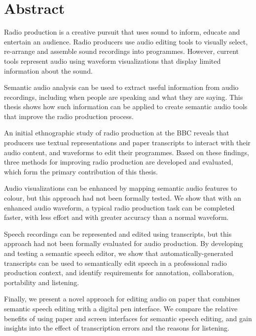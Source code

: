\chapter*{Abstract}

Radio production is a creative pursuit that uses sound to inform, educate and entertain an audience. Radio producers
use audio editing tools to visually select, re-arrange and assemble sound recordings into programmes. However, current
tools represent audio using waveform visualizations that display limited information about the sound.

Semantic audio analysis can be used to extract useful information from audio recordings, including when people are
speaking and what they are saying. This thesis shows how such information can be applied to create semantic audio tools
that improve the radio production process.

An initial ethnographic study of radio production at the BBC reveals that producers use textual representations and
paper transcripts to interact with their audio content, and waveforms to edit their programmes. Based on these
findings, three methods for improving radio production are developed and evaluated, which form the primary contribution
of this thesis.

Audio visualizations can be enhanced by mapping semantic audio features to colour, but this approach had not been
formally tested. We show that with an enhanced audio waveform, a typical radio production task can be completed faster,
with less effort and with greater accuracy than a normal waveform.

Speech recordings can be represented and edited using transcripts, but this approach had not been formally evaluated
for audio production. By developing and testing a semantic speech editor, we show that automatically-generated
transcripts can be used to semantically edit speech in a professional radio production context, and identify
requirements for annotation, collaboration, portability and listening.

Finally, we present a novel approach for editing audio on paper that combines semantic speech editing with a digital
pen interface. We compare the relative benefits of using paper and screen interfaces for semantic speech editing, and
gain insights into the effect of transcription errors and the reasons for listening.

